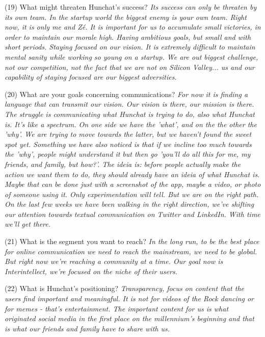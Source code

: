 \documentclass[12pt]{article}
\begin{document}
(19) What might threaten Hunchat’s success? \textit{Its success can only be threaten by its own team. In the startup world the biggest enemy is your own team. Right now, it is only me and Zé. It is important for us to accumulate small victories, in order to maintain our morale high. Having ambitious goals, but small and with short periods. Staying focused on our vision. It is extremely difficult to maintain mental sanity while working so young on a startup. We are out biggest challenge, not our competition, not the fact that we are not on Silicon Valley... us and our capability of staying focused are our biggest adversities.}

(20) What are your goals concerning communications? \textit{For now it is finding a language that can transmit our vision. Our vision is there, our mission is there. The struggle is communicating what Hunchat is trying to do, also what Hunchat is. It's like a spectrum. On one side we have the 'what', and on the the other the 'why'. We are trying to move towards the latter, but we haven't found the sweet spot yet. Something we have also noticed is that if we incline too much towards the 'why', people might understand it but then go 'you'll do all this for me, my friends, and family, but how?'. The ideia is: before people actually make the action we want them to do, they should already have an ideia of what Hunchat is. Maybe that can be done just with a screenshot of the app, maybe a video, or photo of someone using it. Only experimentation will tell. But we are on the right path. On the last few weeks we have been walking in the right direction, we've shifting our attention towards textual communication on Twitter and LinkedIn. With time we'll get there.}

(21) What is the segment you want to reach? \textit{In the long run, to be the best place for online communication we need to reach the mainstream, we need to be global. But right now we're reaching a community at a time. Our goal now is Interintellect, we're focused on the niche of their users.}

(22) What is Hunchat’s positioning? \textit{Transparency, focus on content that the users find important and meaningful. It is not for videos of the Rock dancing or for memes - that's entertainment. The important content for us is what originated social media in the first place on the millennium's beginning and that is what our friends and family have to share with us.}
\end{document}
